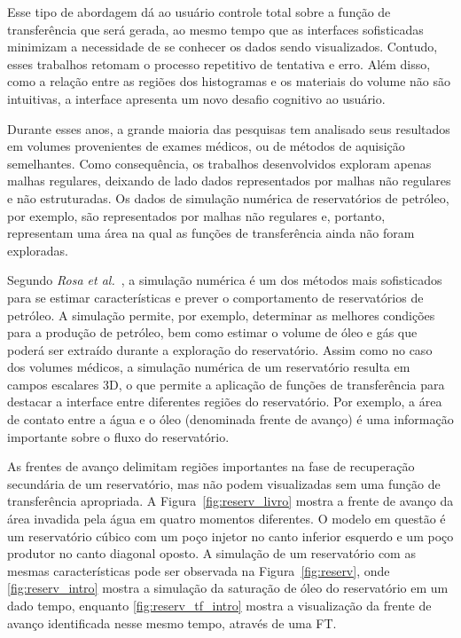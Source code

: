     Esse tipo de abordagem dá ao usuário controle total sobre a função de transferência que será gerada, ao mesmo tempo que as interfaces sofisticadas minimizam a necessidade de se conhecer os dados sendo visualizados. Contudo, esses trabalhos retomam o processo repetitivo de tentativa e erro. Além disso, como a relação entre as regiões dos histogramas e os materiais do volume não são intuitivas, a interface apresenta um novo desafio cognitivo ao usuário.
    
    Durante esses anos, a grande maioria das pesquisas tem analisado seus resultados em volumes provenientes de exames médicos, ou de métodos de aquisição semelhantes. Como consequência, os trabalhos desenvolvidos exploram apenas malhas regulares, deixando de lado dados representados por malhas não regulares e não estruturadas. Os dados de simulação numérica de reservatórios de petróleo, por exemplo, são representados por malhas não regulares e, portanto, representam uma área na qual as funções de transferência ainda não foram exploradas.
    
    Segundo \textit{Rosa et al.}~\cite{rosa}, a simulação numérica é um dos métodos mais sofisticados para se estimar características e prever o comportamento de reservatórios de petróleo. A simulação permite, por exemplo, determinar as melhores condições para a produção de petróleo, bem como estimar o volume de óleo e gás que poderá ser extraído durante a exploração do reservatório. Assim como no caso dos volumes médicos, a simulação numérica de um reservatório resulta em campos escalares 3D, o que permite a aplicação de funções de transferência para destacar a interface entre diferentes regiões do reservatório. Por exemplo, a área de contato entre a água e o óleo (denominada frente de avanço) é uma informação importante sobre o fluxo do reservatório.
    
    As frentes de avanço delimitam regiões importantes na fase de recuperação secundária de um reservatório, mas não podem visualizadas sem uma função de transferência apropriada. A Figura~\ref{fig:reserv_livro} mostra a frente de avanço da área invadida pela água em quatro momentos diferentes. O modelo em questão é um reservatório cúbico com um poço injetor no canto inferior esquerdo e um poço produtor no canto diagonal oposto. A simulação de um reservatório com as mesmas características pode ser observada na Figura~\ref{fig:reserv}, onde \ref{fig:reserv_intro} mostra a simulação da saturação de óleo do reservatório em um dado tempo, enquanto \ref{fig:reserv_tf_intro} mostra a visualização da frente de avanço identificada nesse mesmo tempo, através de uma FT.
    
